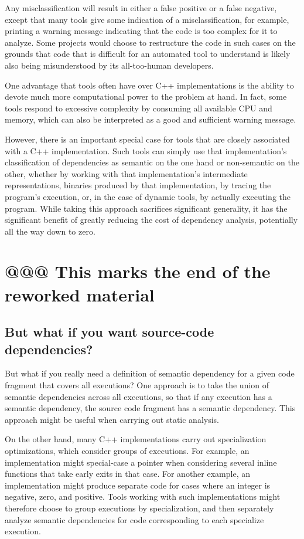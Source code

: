 \documentclass[10]{article}
\begin{document}
Any misclassification will result in either a false positive or
a false negative, except that many tools give some indication of a
misclassification, for example, printing a warning message indicating
that the code is too complex for it to analyze.
Some projects would choose to restructure the code in such cases on the
grounds that code that is difficult for an automated tool to understand
is likely also being misunderstood by its all-too-human developers.

One advantage that tools often have over C++ implementations is the
ability to devote much more computational power to the problem at hand.
In fact, some tools respond to excessive complexity by consuming all
available CPU and memory, which can also be interpreted as a good and
sufficient warning message.

However, there is an important special case for tools that are closely
associated with a C++ implementation.
Such tools can simply use that implementation's classification of
dependencies as semantic on the one hand or non-semantic on the
other, whether by working with that implementation's intermediate
representations, binaries produced by that implementation, by tracing
the program's execution, or, in the case of dynamic tools, by actually
executing the program.
While taking this approach sacrifices significant generality, it has the
significant benefit of greatly reducing the cost of dependency analysis,
potentially all the way down to zero.

\section{@@@ This marks the end of the reworked material}

\subsection{But what if you want source-code dependencies?}

But what if you really need a definition of semantic dependency
for a given code fragment that covers all executions?
One approach is to take the union of semantic dependencies across
all executions, so that if any execution has a semantic dependency,
the source code fragment has a semantic dependency.
This approach might be useful when carrying out static analysis.

On the other hand, many C++ implementations carry out specialization
optimizations, which consider groups of executions.
For example, an implementation might special-case a  pointer when
considering several inline functions that take early exits in that case.
For another example, an implementation might produce separate code for
cases where an integer is negative, zero, and positive.
Tools working with such implementations might therefore choose to group
executions by specialization, and then separately analyze semantic
dependencies for code corresponding to each specialize execution.
\end{document}
